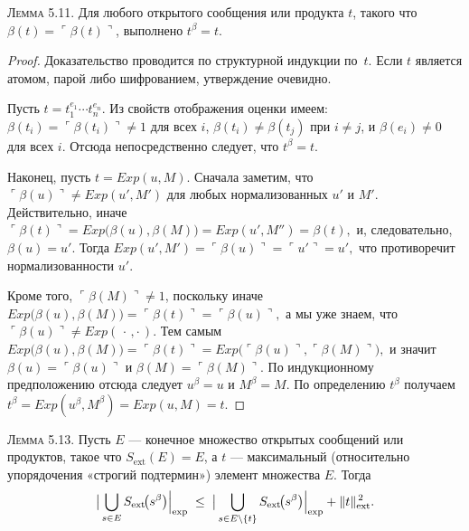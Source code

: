 
\textsc{Лемма 5.11.}
Для любого открытого сообщения или продукта $t$,
такого что $\beta(t)=\ulcorner\beta(t)\urcorner$, выполнено $t^{\beta}=t$.

\begin{proof}
Доказательство проводится по структурной индукции по~$t$.
Если $t$ является атомом, парой либо шифрованием,
утверждение очевидно.

Пусть $t=t_{1}^{e_{1}}\!\cdots t_{n}^{e_{n}}$.
Из свойств отображения оценки имеем:
$\beta(t_{i})=\ulcorner\beta(t_{i})\urcorner\neq1$ для всех $i$,
$\beta(t_{i})\neq\beta(t_{j})$ при $i\neq j$,
и $\beta(e_{i})\neq0$ для всех $i$.
Отсюда непосредственно следует, что $t^{\beta}=t$.

Наконец, пусть $t= Exp(u,M)$.  
Сначала заметим, что $\ulcorner\beta(u)\urcorner\neq Exp(u',M')$
для любых нормализованных $u'$ и $M'$.
Действительно, иначе
\(
  \ulcorner \beta(t)\urcorner= Exp\!\bigl(\beta(u),\beta(M)\bigr)
          = Exp(u',M'')=\beta(t),
\)
и, следовательно, $\beta(u)=u'$.
Тогда
\(
   Exp(u',M')=\ulcorner\beta(u)\urcorner=\ulcorner u'\urcorner = u',
\)
что противоречит нормализованности $u'$.

Кроме того, $\ulcorner\beta(M)\urcorner\neq1$, поскольку иначе
\(
   Exp\!\bigl(\beta(u),\beta(M)\bigr)
     =\ulcorner\beta(t)\urcorner=\ulcorner\beta(u)\urcorner,
\)
а мы уже знаем, что $\ulcorner\beta(u)\urcorner\neq Exp(\,\cdot\,,\cdot\,)$.
Тем самым
\(
   Exp\!\bigl(\beta(u),\beta(M)\bigr)=\ulcorner\beta(t)\urcorner
                                     = Exp\!\bigl(\ulcorner\beta(u)\urcorner,\ulcorner\beta(M)\urcorner\bigr),
\)
и значит $\beta(u)=\ulcorner\beta(u)\urcorner$ и $\beta(M)=\ulcorner\beta(M)\urcorner$.
По индукционному предположению отсюда следует
$u^{\beta}=u$ и $M^{\beta}=M$.
По определению $t^{\beta}$ получаем
\(
  t^{\beta}= Exp(u^{\beta},M^{\beta})
          = Exp(u,M)=t.
\)
\end{proof}

\textsc{Лемма 5.13.}
Пусть $E$ — конечное множество открытых сообщений или продуктов,
такое что $S_{\text{ext}}(E)=E$, а $t$ — максимальный
(относительно упорядочения «строгий подтермин»)
элемент множества $E$.
Тогда
\[
  \bigl\lvert\,
        \bigcup_{s\in E} S_{\text{ext}}\!\bigl(s^{\beta}\bigr)
        \Bigr{\rvert}_{\text{exp}}
  \;\le\;
  \bigl\lvert\,
        \bigcup_{s\in E\setminus\{t\}}
            S_{\text{ext}}\!\bigl(s^{\beta}\bigr)
            \Bigr{\rvert}_{\text{exp}}
  +\lVert t\rVert_{\text{ext}}^{\,2}.
\]

